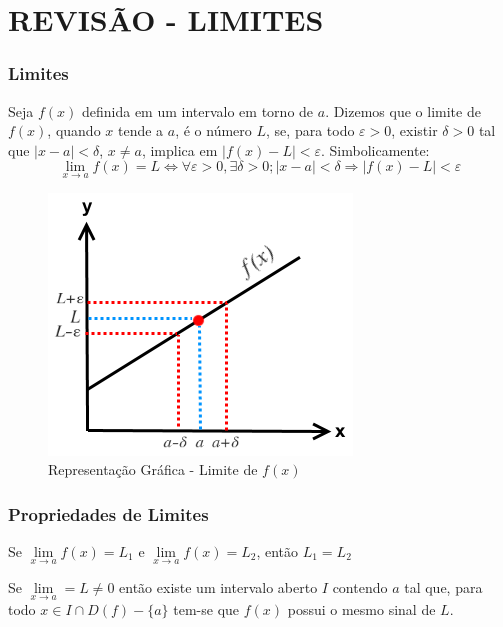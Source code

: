 \documentclass[hyperref={pdfpagelabels=false}]{beamer}
\begin{document}
\section{REVISÃO - LIMITES}
\begin{frame}
\frametitle{Limites}

\begin{definition}[Limites]
	Seja $f(x)$ definida em um intervalo em torno de $a$. Dizemos que o limite de $f(x)$, quando $x$ tende a $a$, é o número $L$, se, para todo $\varepsilon > 0$, existir $\delta > 0$ tal que $|x-a|< \delta$, $x \neq a$, implica em $|f(x)-L|<\varepsilon$. Simbolicamente:
	$$\lim\limits_{x \rightarrow a}f(x) = L \Leftrightarrow \forall \varepsilon > 0, \exists \delta > 0 ; |x-a| < \delta \Rightarrow |f(x) - L| < \varepsilon$$
\end{definition}

\pause

\begin{figure}[!h]
	\centering
	\includegraphics[scale=0.4]{lim}
	\caption{Representação Gráfica - Limite de $f(x)$}
	\label{graflim}
\end{figure}

\end{frame}


\begin{frame}
\frametitle{Propriedades de Limites}
\begin{theorem}
	Se $\lim\limits_{x \rightarrow a}f(x) = L_1$ e $\lim\limits_{x \rightarrow a}f(x) = L_2$, então $L_1 = L_2$
\end{theorem}

\pause

\begin{theorem}
	Se $\lim\limits_{x \rightarrow a} = L \neq 0$ então existe um intervalo aberto $I$ contendo $a$ tal que, para todo $x \in I \cap D(f)-\{a\}$ tem-se que $f(x)$ possui o mesmo sinal de $L$.
\end{theorem}
\end{frame}
\end{document}
